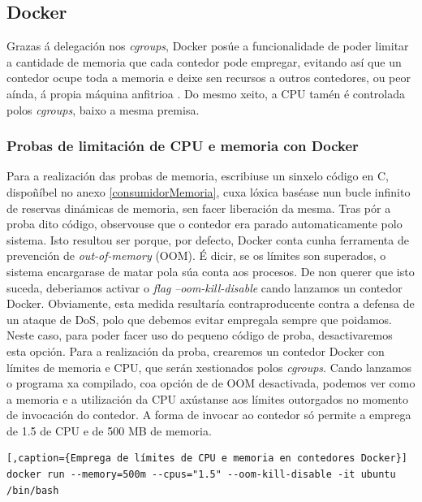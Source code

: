 \subsection{Docker}

Grazas á delegación nos \textit{cgroups}, Docker posúe a funcionalidade de poder limitar a cantidade de memoria que cada contedor pode empregar, evitando así que un contedor ocupe toda a memoria e deixe sen recursos a outros contedores, ou peor aínda, á propia máquina anfitrioa \cite{state-of-art-docker-security}. Do mesmo xeito, a CPU tamén é controlada polos \textit{cgroups}, baixo a mesma premisa.

\subsubsection{Probas de limitación de CPU e memoria con Docker}

Para a realización das probas de memoria, escribiuse un sinxelo código en C, dispoñíbel no anexo \ref{consumidorMemoria}, cuxa lóxica baséase nun bucle infinito de reservas dinámicas de memoria, sen facer liberación da mesma. Tras pór a proba dito código, observouse que o contedor era parado automaticamente polo sistema. Isto resultou ser porque, por defecto, Docker conta cunha ferramenta de prevención de \textit{out-of-memory} (\gls{OOM}). É dicir, se os límites son superados, o sistema encargarase de matar pola súa conta aos procesos. De non querer que isto suceda, deberiamos activar o \textit{flag} \textit{--oom-kill-disable} cando lanzamos un contedor Docker. Obviamente, esta medida resultaría contraproducente contra a defensa de un ataque de \gls{DoS}, polo que debemos evitar empregala sempre que poidamos.\\

Neste caso, para poder facer uso do pequeno código de proba, desactivaremos esta opción. Para a realización da proba, crearemos un contedor Docker con límites de memoria e CPU, que serán xestionados polos \textit{cgroups}. Cando lanzamos o programa xa compilado, coa opción de de \gls{OOM} desactivada, podemos ver como a memoria e a utilización da CPU axústanse aos límites outorgados no momento de invocación do contedor. A forma de invocar ao contedor só permite a emprega de 1.5 de CPU e de 500 MB de memoria.

\begin{lstlisting}[,caption={Emprega de límites de CPU e memoria en contedores Docker}]
docker run --memory=500m --cpus="1.5" --oom-kill-disable -it ubuntu /bin/bash
\end{lstlisting}

